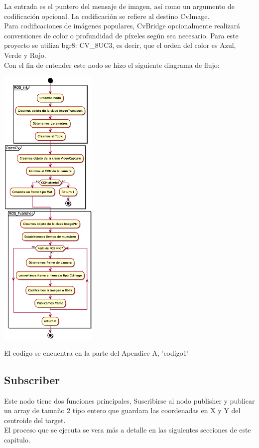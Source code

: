 La entrada es el puntero del mensaje de imagen, así como un argumento de
codificación opcional. La codificación se refiere al destino CvImage.\\
Para codificaciones de imágenes populares, CvBridge opcionalmente realizará
conversiones de color o profundidad de píxeles según sea necesario. Para este proyecto
se utiliza bgr8: CV\_8UC3, es decir, que el orden del color es Azul, Verde y Rojo.\\
Con el fin de entender este nodo se hizo el siguiente diagrama de flujo:
\begin{center}
	\includegraphics[width=0.35\textwidth]{Contenido/Cuerpo/Capitulo4/publisher.eps}
	\label{Fig5}
\end{center}
El codigo se encuentra en la parte del Apendice A, 'codigo1'

\subsection{Subscriber}
Este nodo tiene dos funciones principales, Suscribirse al nodo publisher y publicar
un array de tamaño 2 tipo entero que guardara las coordenadas en X y Y del centroide
del target.\\
El proceso que se ejecuta se vera más a detalle en las siguientes secciones de este
capitulo.


